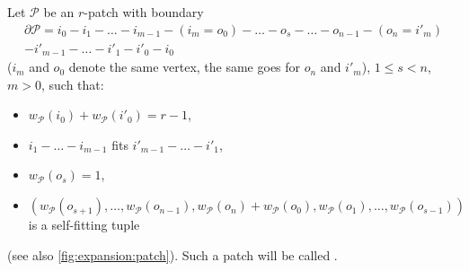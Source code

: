 \begin{definition}\label{def:expansion:patch} Let $\mathcal{P}$ be an $r$-patch with boundary
\begin{multline*}
  \partial\mathcal{P} = i_0 - i_1 - \dots - i_{m-1} - (i_m = o_0) - \dots - o_s - \dots - o_{n - 1} - (o_n = i'_m) \\
  - i'_{m-1} - \dots - i'_1 - i'_0 - i_0
\end{multline*}
($i_m$ and $o_0$ denote the same vertex, the same goes for $o_n$ and $i'_m$), $1 \leq s < n$, $m > 0$, such that:
  \begin{itemize}
  \item $w_{\mathcal{P}}(i_0) + w_{\mathcal{P}}(i'_0) = r - 1$,
  \item $i_1 - \dots - i_{m-1}$ fits $i'_{m-1} - \dots - i'_1$,
  \item $w_{\mathcal{P}}(o_s) = 1$,
  \item $(w_{\mathcal{P}}(o_{s + 1}), \dots, w_{\mathcal{P}}(o_{n - 1}), w_{\mathcal{P}}(o_n) + w_{\mathcal{P}}(o_0), w_{\mathcal{P}}(o_1), \dots, w_{\mathcal{P}}(o_{s - 1}))$ is a self-fitting tuple
  \end{itemize}
  (see also \autoref{fig:expansion:patch}). Such a patch will be called .
\end{definition}

